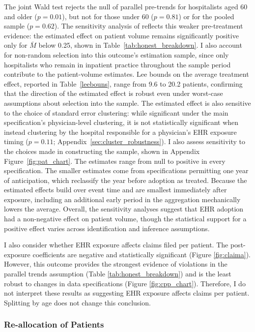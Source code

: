 \documentclass[12pt]{article}
\begin{document}
The joint Wald test rejects the null of parallel pre-trends for hospitalists aged 60 and older ($p = 0.01$), but not for those under 60 ($p = 0.81$) or for the pooled sample ($p = 0.62$). The sensitivity analysis of \citet{rambachan2019honest} reflects this weaker pre-treatment evidence: the estimated effect on patient volume remains significantly positive only for $\bar{M}$ below 0.25, shown in Table~\ref{tab:honest_breakdown}. I also account for non-random selection into this outcome's estimation sample, since only hospitalists who remain in inpatient practice throughout the sample period contribute to the patient-volume estimates. Lee bounds on the average treatment effect, reported in Table~\ref{leebouns}, range from 9.6 to 20.2 patients, confirming that the direction of the estimated effect is robust even under worst-case assumptions about selection into the sample. The estimated effect is also sensitive to the choice of standard error clustering: while significant under the main specification's physician-level clustering, it is not statistically significant when instead clustering by the hospital responsible for a physician's EHR exposure timing ($p = 0.11$; Appendix~\ref{sec:cluster_robustness}). I also assess sensitivity to the choices made in constructing the sample, shown in Appendix Figure~\ref{fig:pat_chart}. The estimates range from null to positive in every specification. The smaller estimates come from specifications permitting one year of anticipation, which reclassify the year before adoption as treated. Because the estimated effects build over event time and are smallest immediately after exposure, including an additional early period in the aggregation mechanically lowers the average. Overall, the sensitivity analyses suggest that EHR adoption had a non-negative effect on patient volume, though the statistical support for a positive effect varies across identification and inference assumptions.

I also consider whether EHR exposure affects claims filed per patient. The post-exposure coefficients are negative and statistically significant (Figure \ref{fig:claima}). However, this outcome provides the strongest evidence of violations in the parallel trends assumption (Table \ref{tab:honest_breakdown}) and is the least robust to changes in data specifications (Figure \ref{fig:cpp_chart}). Therefore, I do not interpret these results as suggesting EHR exposure affects claims per patient. Splitting by age does not change this conclusion.


\subsubsection{Re-allocation of Patients}
\end{document}
